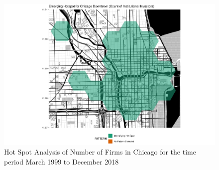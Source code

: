 \begin{figure}
	\centering
	\includegraphics[width=1\linewidth]{Figures/ChapterIV/Chi_Count_EH_Downtown}
	\caption[Hot Spot Analysis of Number of Firms in Downtown Chicago 1999-2018]{Hot Spot Analysis of Number of Firms in Chicago for the time period March 1999 to December 2018}
	\label{fig:Chicagocounthotspot_Downtown}
\end{figure}


